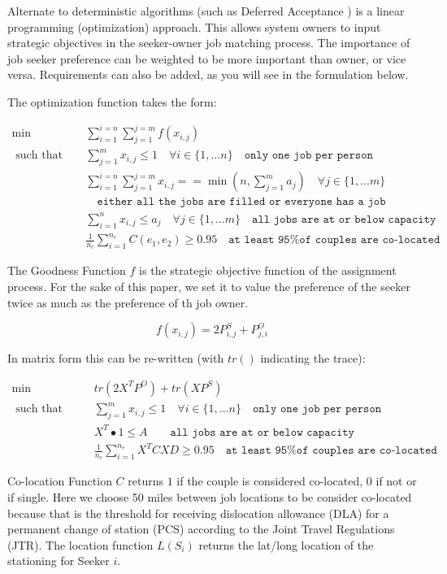 Alternate to deterministic algorithms (such as Deferred Acceptance \cite{1962_Gale}) is a linear programming (optimization) approach. This allows system owners to input strategic objectives in the seeker-owner job matching process. The importance of job seeker preference can be weighted to be more important than owner, or vice versa. Requirements can also be added, as you will see in the formulation below.

The optimization function takes the form:

\begin{align}
\min \qquad & \sum_{i = 1}^{i=n} \sum_{j = 1}^{j=m} f(x_{i,j}) \\
\text{ such that } \qquad & \sum_{j=1}^m x_{i,j} \leq 1 \quad  \forall i \in \{1, \dots n\} \quad \texttt{only one job per person} \\
& \sum_{i = 1}^{i=n} \sum_{j = 1}^{j=m}x_{i,j} == \min \left(n,\sum_{j = 1}^{m}a_j \right) \quad  \forall j \in \{1, \dots m\} \\& \quad \texttt{either all the jobs are filled or everyone has a job} \\
& \sum_{i=1}^n x_{i,j} \leq a_j \quad  \forall j \in \{1, \dots m\} \quad \texttt{all jobs are at or below capacity} \\
& \frac{1}{n_c} \sum_{i=1}^{n_e} C(e_1, e_2) \geq 0.95 \quad \texttt{at least 95\% of couples are co-located}
\end{align}

The Goodness Function $f$ is the strategic objective function of the assignment process. For the sake of this paper, we set it to value the preference of the seeker twice as much as the preference of th job owner.

\[f(x_{i,j}) = 2P^S_{i,j} + P^O_{j,i}\]

In matrix form this can be re-written (with $tr()$ indicating the trace):

\begin{align}
\min \qquad & tr(2X^TP^O) + tr(XP^S) \\
\text{ such that } \qquad & \sum_{j=1}^m x_{i,j} \leq 1 \quad  \forall i \in \{1, \dots n\} \quad \texttt{only one job per person} \\
& X^T \bullet 1 \leq A \quad \quad \texttt{all jobs are at or below capacity} \\
& \frac{1}{n_c} \sum_{i=1}^{n_e} X^TCXD \geq 0.95 \quad \texttt{at least 95\% of couples are co-located}
\end{align}


Co-location Function $C$ returns $1$ if the couple is considered co-located, 0 if not or if single. Here we choose 50 miles between job locations to be consider co-located because that is the threshold for receiving dislocation allowance (DLA) for a permanent change of station (PCS) according to the Joint Travel Regulations (JTR). The location function $L(S_i)$ returns the lat/long location of the stationing for Seeker $i$. 

